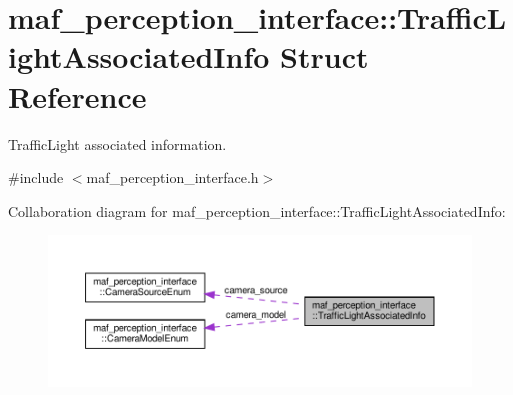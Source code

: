 \hypertarget{structmaf__perception__interface_1_1TrafficLightAssociatedInfo}{}\section{maf\+\_\+perception\+\_\+interface\+:\+:Traffic\+Light\+Associated\+Info Struct Reference}
\label{structmaf__perception__interface_1_1TrafficLightAssociatedInfo}


Traffic\+Light associated information.  




{\ttfamily \#include $<$maf\+\_\+perception\+\_\+interface.\+h$>$}



Collaboration diagram for maf\+\_\+perception\+\_\+interface\+:\+:Traffic\+Light\+Associated\+Info\+:\nopagebreak
\begin{figure}[H]
\begin{center}
\leavevmode
\includegraphics[width=350pt]{structmaf__perception__interface_1_1TrafficLightAssociatedInfo__coll__graph}
\end{center}
\end{figure}
